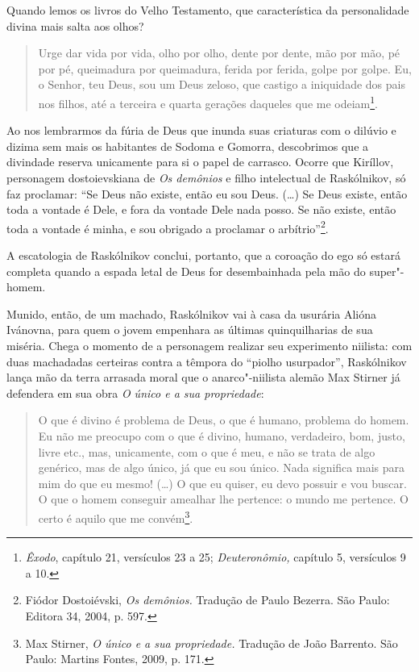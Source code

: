 Quando lemos os livros do Velho Testamento, que característica da
personalidade divina mais salta aos olhos?

\begin{quote}
Urge dar vida por vida, olho por olho, dente por dente, mão por mão, pé
por pé, queimadura por queimadura, ferida por ferida, golpe por golpe.
Eu, o Senhor, teu Deus, sou um Deus zeloso, que castigo a iniquidade dos
pais nos filhos, até a terceira e quarta gerações daqueles que me
odeiam\footnote{\emph{Êxodo}, capítulo 21, versículos 23 a 25;
  \emph{Deuteronômio,} capítulo 5, versículos 9 a 10.}.
\end{quote}

Ao nos lembrarmos da fúria de Deus que inunda suas criaturas com o
dilúvio e dizima sem mais os habitantes de Sodoma e Gomorra, descobrimos
que a divindade reserva unicamente para si o papel de carrasco. Ocorre
que Kiríllov, personagem dostoievskiana de \emph{Os demônios} e filho
intelectual de Raskólnikov, só faz proclamar: ``Se Deus não existe,
então eu sou Deus. (\ldots{}) Se Deus existe, então toda a vontade é Dele, e
fora da vontade Dele nada posso. Se não existe, então toda a vontade é
minha, e sou obrigado a proclamar o arbítrio''\footnote{Fiódor
  Dostoiévski, \emph{Os demônios.} Tradução de Paulo Bezerra. São Paulo:
  Editora 34, 2004, p. 597.}.

A escatologia de Raskólnikov conclui, portanto, que a coroação do ego só
estará completa quando a espada letal de Deus for desembainhada pela mão
do super"-homem.

Munido, então, de um machado, Raskólnikov vai à casa da usurária Alióna
Ivánovna, para quem o jovem empenhara as últimas quinquilharias de sua
miséria. Chega o momento de a personagem realizar seu experimento
niilista: com duas machadadas certeiras contra a têmpora do ``piolho
usurpador'', Raskólnikov lança mão da terra arrasada moral que o
anarco"-niilista alemão Max Stirner já defendera em sua obra \emph{O
único e a sua propriedade}:

\begin{quote}
O que é divino é problema de Deus, o que é humano, problema do homem. Eu
não me preocupo com o que é divino, humano, verdadeiro, bom, justo,
livre etc., mas, unicamente, com o que é meu, e não se trata de algo
genérico, mas de algo único, já que eu sou único. Nada significa mais
para mim do que eu mesmo! (\ldots{}) O que eu quiser, eu devo possuir e vou
buscar. O que o homem conseguir amealhar lhe pertence: o mundo me
pertence. O certo é aquilo que me convém\footnote{Max Stirner, \emph{O
  único e a sua propriedade.} Tradução de João Barrento. São Paulo:
  Martins Fontes, 2009, p. 171.}.
\end{quote}

